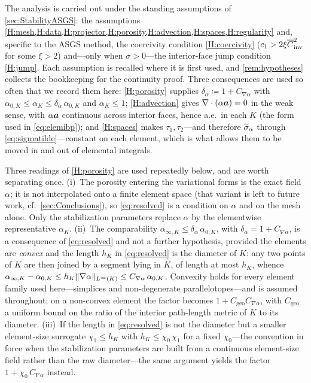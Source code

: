 The analysis is carried out under the standing assumptions of \cref{sec:StabilityASGS}: the
assumptions \cref{H:mesh,H:data,H:projector,H:porosity,H:advection,H:spaces,H:regularity} and,
specific to the ASGS method, the coercivity condition \cref{H:coercivity}
($c_1>2\xi\overline{C}_{\mathrm{inv}}^2$ for some $\xi>2$) and---only when $\sigma>0$---the interior{\hyp}face jump
condition \cref{H:jump}. Each assumption is recalled
where it is first used, and \cref{rem:hypotheses} collects the bookkeeping for the continuity
proof. Three consequences are used so often that we record them here: \cref{H:porosity}
supplies $\delta_\alpha\coloneqq 1+C_{\nabla\alpha}$ with
$\alpha_{0,K}\le\alpha_K\le\delta_\alpha\,\alpha_{0,K}$ and $\alpha_K\le1$; \cref{H:advection}
gives $\nabla\cdot(\alpha\boldsymbol{a})=0$ in the weak sense, with $\alpha\boldsymbol{a}$ continuous across interior
faces, hence a.e.\ in each $K$ (the form used in \cref{eq:elemibp}); and \cref{H:spaces} makes
$\tau_1,\tau_2$---and therefore $\widetilde{\sigma}_{\alpha}$ through \cref{eq:sigmatilde}---constant on each
element, which is what allows them to be moved in and out of elemental integrals.

\begin{remark}
\label{rem:porosityresolution}
Three readings of \cref{H:porosity} are used repeatedly below, and are worth separating
once. (i)~The porosity entering the variational forms is the exact field $\alpha$; it is not
interpolated onto a finite element space (that variant is left to future work, cf.\
\cref{sec:Conclusions}), so \cref{eq:resolved} is a condition on $\alpha$ and on the mesh alone.
Only the stabilization parameters replace $\alpha$ by the elementwise representative $\alpha_K$.
(ii)~The comparability $\alpha_{\infty,K}\le\delta_\alpha\,\alpha_{0,K}$, with
$\delta_\alpha=1+C_{\nabla\alpha}$, is a consequence of \cref{eq:resolved} and not a further
hypothesis, provided the elements are \emph{convex} and the length $h_K$ in \cref{eq:resolved}
is the diameter of $K$: any two points of $K$ are then joined by a segment lying in $K$, of
length at most $h_K$, whence
$\alpha_{\infty,K}-\alpha_{0,K}\le h_K\lVert\nabla\alpha\rVert_{L^\infty(K)}\le
C_{\nabla\alpha}\,\alpha_{0,K}$. Convexity holds for every element family used
here---simplices and non{\hyp}degenerate parallelotopes---and is assumed throughout; on a
non{\hyp}convex element the factor becomes $1+C_{\mathrm{geo}}C_{\nabla\alpha}$, with
$C_{\mathrm{geo}}$ a uniform bound on the ratio of the interior path{\hyp}length metric of $K$
to its diameter. (iii)~If the length in \cref{eq:resolved} is not the diameter but a smaller
element{\hyp}size surrogate $\chi_1\le h_K$ with $h_K\le\chi_0\,\chi_1$ for a fixed
$\chi_0$---the convention in force when the stabilization parameters are built from a continuous
element{\hyp}size field rather than the raw diameter---the same argument yields the factor
$1+\chi_0\,C_{\nabla\alpha}$ instead.
\end{remark}

